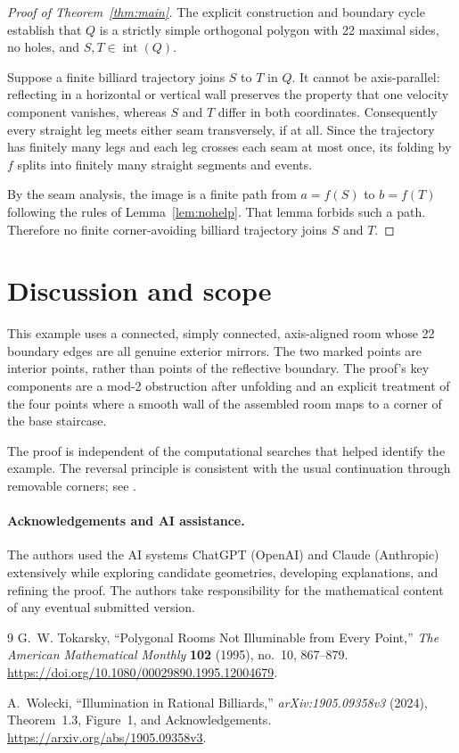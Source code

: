 \documentclass[11pt]{article}
\theoremstyle{remark}
\newcommand{\interior}{\operatorname{int}}
\begin{document}
\begin{proof}[Proof of Theorem~\ref{thm:main}]
The explicit construction and boundary cycle establish that $Q$ is a strictly simple orthogonal polygon with 22 maximal sides, no holes, and $S,T\in\interior(Q)$.

Suppose a finite billiard trajectory joins $S$ to $T$ in $Q$. It cannot be axis-parallel: reflecting in a horizontal or vertical wall preserves the property that one velocity component vanishes, whereas $S$ and $T$ differ in both coordinates. Consequently every straight leg meets either seam transversely, if at all. Since the trajectory has finitely many legs and each leg crosses each seam at most once, its folding by $f$ splits into finitely many straight segments and events.

By the seam analysis, the image is a finite path from $a=f(S)$ to $b=f(T)$ following the rules of Lemma~\ref{lem:nohelp}. That lemma forbids such a path. Therefore no finite corner-avoiding billiard trajectory joins $S$ and $T$.
\end{proof}

\section{Discussion and scope}
This example uses a connected, simply connected, axis-aligned room whose 22 boundary edges are all genuine exterior mirrors. The two marked points are interior points, rather than points of the reflective boundary. The proof's key components are a mod-2 obstruction after unfolding and an explicit treatment of the four points where a smooth wall of the assembled room maps to a corner of the base staircase.

The proof is independent of the computational searches that helped identify the example. The reversal principle is consistent with the usual continuation through removable corners; see \cite[Remark~2.2]{Wolecki2024}.

\paragraph{Acknowledgements and AI assistance.}
The authors used the AI systems ChatGPT (OpenAI) and Claude (Anthropic) extensively while exploring candidate geometries, developing explanations, and refining the proof. The authors take responsibility for the mathematical content of any eventual submitted version.

\begin{thebibliography}{9}
G.~W. Tokarsky, ``Polygonal Rooms Not Illuminable from Every Point,''
\emph{The American Mathematical Monthly} \textbf{102} (1995), no.~10, 867--879.
\url{https://doi.org/10.1080/00029890.1995.12004679}.

A.~Wolecki, ``Illumination in Rational Billiards,''
\emph{arXiv:1905.09358v3} (2024), Theorem~1.3, Figure~1, and Acknowledgements.
\url{https://arxiv.org/abs/1905.09358v3}.
\end{thebibliography}
\end{document}
